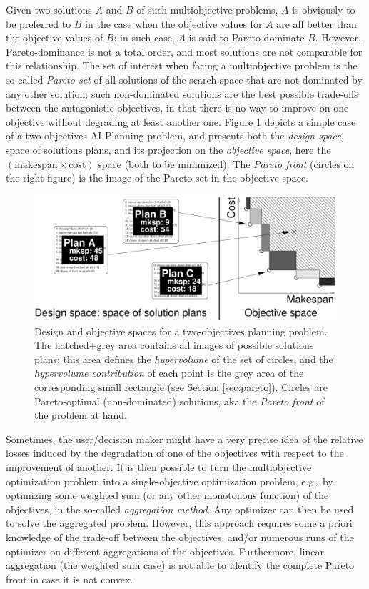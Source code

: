 \documentclass[letterpaper]{article}
\begin{document}
Given two solutions $A$ and $B$ of such multiobjective problems, $A$ is obviously to be preferred to $B$ in the case when the objective values for $A$ are all better than the objective values of $B$: in such case, $A$ is said to Pareto-dominate $B$. However, Pareto-dominance is not a total order, and most solutions are not comparable for this relationship. The set of interest when facing a multiobjective problem is the so-called {\em Pareto set} of all solutions of the search space that are not dominated by any other solution: such non-dominated solutions are the best possible trade-offs between the antagonistic objectives, in that there is no way to improve on one objective without degrading at least another one. Figure \ref{fig:hypervolume} depicts a simple case of a two objectives AI Planning problem, and presents both the {\em design space}, space of solutions plans, and its projection on the {\em objective space}, here the $(\mbox{makespan} \times \mbox{cost})$ space (both to be minimized). The {\em 
Pareto front} (circles on the right figure) is the image of the Pareto set in the objective space.

\begin{figure}[h!]
\centerline{ \includegraphics[width=.99\columnwidth]{figures/hypervolumeContributionDAE-V2}}
\caption{Design and objective spaces for a two-objectives planning problem. The hatched+grey area contains all images of possible solutions plans; this area defines the {\em hypervolume} of the set of circles, and the {\em hypervolume contribution} of each point is the grey area of the corresponding small rectangle (see Section \ref{sec:pareto}). Circles are Pareto-optimal (non-dominated) solutions, aka the {\em Pareto front} of the problem at hand.}
\label{fig:hypervolume}
\end{figure}


Sometimes, the user/decision maker might have a very precise idea of the relative losses induced by the degradation of one of the objectives with respect to the improvement of another. It is then possible to turn the multiobjective optimization problem into a single-objective optimization problem, e.g., by optimizing some weighted sum (or any other monotonous function) of the objectives, in the so-called {\em aggregation method}. Any optimizer can then be used to solve the aggregated problem. However, this approach requires some a priori knowledge of the trade-off between the objectives, and/or numerous runs of the optimizer on different aggregations of the objectives. Furthermore, linear aggregation (the weighted sum case) is not able to identify the complete Pareto front in case it is not convex. 
\end{document}
